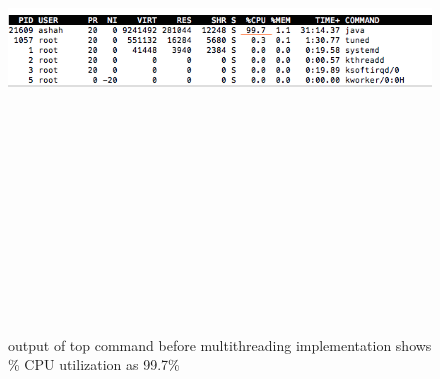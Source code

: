 \begin{figure}[htb]
\centering
\includegraphics[width=16cm,height=15cm,keepaspectratio]{image/cpu-per-1.png}
\caption[CPU utilization before multithreading implementation]{output of top command before multithreading implementation
shows \% CPU utilization as 99.7\%} 
\label{fig:cpu-per-1}
\end{figure}

